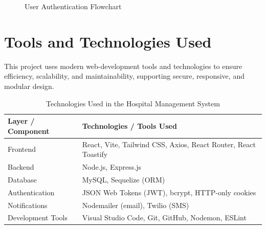 \documentclass[12pt,a4paper]{report}
\begin{document}
\begin{figure}[htbp]
\centering
{}
\caption{User Authentication Flowchart}
\label{fig:flow-auth}
\end{figure}

\section{Tools and Technologies Used}
This project uses modern web-development tools and technologies to ensure efficiency,
scalability, and maintainability, supporting secure, responsive, and modular design.

\begin{table}[htbp]
\centering
\renewcommand{\arraystretch}{1.3}
\begin{tabular}{@{}p{4.2cm} p{9cm}@{}}
\toprule
\textbf{Layer / Component} & \textbf{Technologies / Tools Used} \\
\midrule
Frontend & React, Vite, Tailwind CSS, Axios, React Router, React Toastify \\
Backend & Node.js, Express.js \\
Database & MySQL, Sequelize (ORM) \\
Authentication & JSON Web Tokens (JWT), bcrypt, HTTP-only cookies \\
Notifications & Nodemailer (email), Twilio (SMS) \\
Development Tools & Visual Studio Code, Git, GitHub, Nodemon, ESLint \\
\bottomrule
\end{tabular}
\caption{Technologies Used in the Hospital Management System}
\label{tab:tech}
\end{table}
\end{document}

